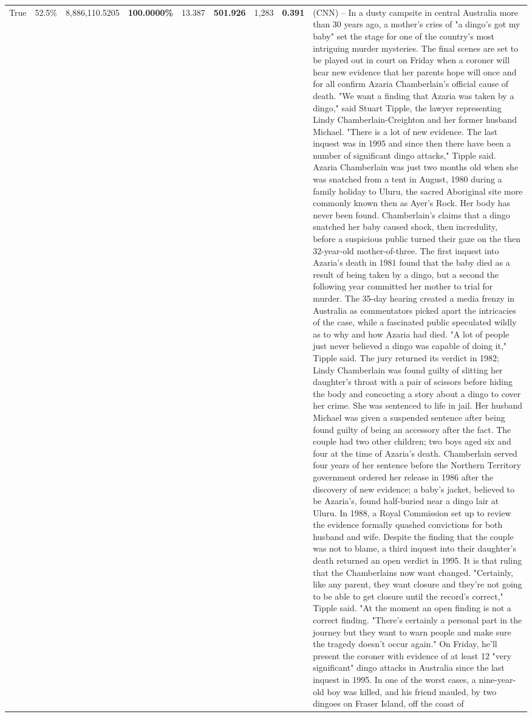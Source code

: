 \begin{table}[H]
\begin{tabular}{lllrlllll}
True & 52.5\% & 8,886,110.5205 & \bfseries \color{red} 100.0000\% & 13.387 & \bfseries \color{red} 501.926 & 1,283 & \bfseries \color{red} 0.391 & (CNN) -- In a dusty campsite in central Australia more than 30 years ago, a mother's cries of "a dingo's got my baby" set the stage for one of the country's most intriguing murder mysteries. The final scenes are set to be played out in court on Friday when a coroner will hear new evidence that her parents hope will once and for all confirm Azaria Chamberlain's official cause of death. "We want a finding that Azaria was taken by a dingo," said Stuart Tipple, the lawyer representing Lindy Chamberlain-Creighton and her former husband Michael. "There is a lot of new evidence. The last inquest was in 1995 and since then there have been a number of significant dingo attacks," Tipple said. Azaria Chamberlain was just two months old when she was snatched from a tent in August, 1980 during a family holiday to Uluru, the sacred Aboriginal site more commonly known then as Ayer's Rock. Her body has never been found. Chamberlain's claims that a dingo snatched her baby caused shock, then incredulity, before a suspicious public turned their gaze on the then 32-year-old mother-of-three. The first inquest into Azaria's death in 1981 found that the baby died as a result of being taken by a dingo, but a second the following year committed her mother to trial for murder. The 35-day hearing created a media frenzy in Australia as commentators picked apart the intricacies of the case, while a fascinated public speculated wildly as to why and how Azaria had died. "A lot of people just never believed a dingo was capable of doing it," Tipple said. The jury returned its verdict in 1982; Lindy Chamberlain was found guilty of slitting her daughter's throat with a pair of scissors before hiding the body and concocting a story about a dingo to cover her crime. She was sentenced to life in jail. Her husband Michael was given a suspended sentence after being found guilty of being an accessory after the fact. The couple had two other children; two boys aged six and four at the time of Azaria's death. Chamberlain served four years of her sentence before the Northern Territory government ordered her release in 1986 after the discovery of new evidence; a baby's jacket, believed to be Azaria's, found half-buried near a dingo lair at Uluru. In 1988, a Royal Commission set up to review the evidence formally quashed convictions for both husband and wife. Despite the finding that the couple was not to blame, a third inquest into their daughter's death returned an open verdict in 1995. It is that ruling that the Chamberlains now want changed. "Certainly, like any parent, they want closure and they're not going to be able to get closure until the record's correct," Tipple said. "At the moment an open finding is not a correct finding. "There's certainly a personal part in the journey but they want to warn people and make sure the tragedy doesn't occur again." On Friday, he'll present the coroner with evidence of at least 12 "very significant" dingo attacks in Australia since the last inquest in 1995. In one of the worst cases, a nine-year-old boy was killed, and his friend mauled, by two dingoes on Fraser Island, off the coast of 
\end{tabular}
\end{table}
